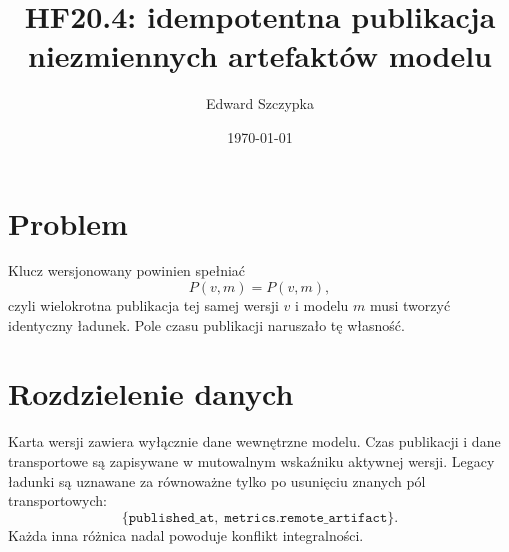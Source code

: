 \documentclass[11pt,a4paper]{article}
\title{HF20.4: idempotentna publikacja niezmiennych artefaktów modelu}
\author{Edward Szczypka}
\date{\today}
\begin{document}
\maketitle
\section{Problem}
Klucz wersjonowany powinien spełniać
\[
P(v,m)=P(v,m),
\]
czyli wielokrotna publikacja tej samej wersji $v$ i modelu $m$ musi tworzyć
identyczny ładunek. Pole czasu publikacji naruszało tę własność.
\section{Rozdzielenie danych}
Karta wersji zawiera wyłącznie dane wewnętrzne modelu. Czas publikacji i dane
transportowe są zapisywane w mutowalnym wskaźniku aktywnej wersji. Legacy
ładunki są uznawane za równoważne tylko po usunięciu znanych pól transportowych:
\[
\{\texttt{published\_at},\;\texttt{metrics.remote\_artifact}\}.
\]
Każda inna różnica nadal powoduje konflikt integralności.
\end{document}
